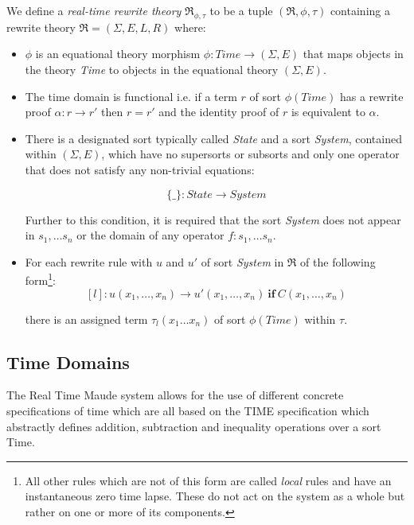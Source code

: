 \medskip
\begin{mydef}
We define a \emph{real-time rewrite theory} $\mathfrak{R}_{\phi,\tau}$ to be a tuple $(\mathfrak{R}, \phi,\tau)$ containing a rewrite theory $\mathfrak{R} = (\Sigma, E,L,R) $ where:

\begin{itemize}
\item $\phi$ is an equational theory morphism $\phi : \mathit{Time} \to (\Sigma, E)$ that maps objects in the theory \textit{Time} to objects in the equational theory $(\Sigma , E)$.

\item The time domain is functional i.e. if a term $r$ of sort $\phi(Time)$  has a rewrite proof $\alpha: r \to r'$ then $r = r'$ and the identity proof of $r$ is equivalent to $\alpha$.

\item There is a designated sort typically called \textit{State} and a sort \textit{System}, contained within $(\Sigma, E)$, which have no supersorts or subsorts and only one operator that does not satisfy any non-trivial equations:

$$\{\_\}: State \to System$$

Further to this condition, it is required that the sort \textit{System} does not appear in $s_1, \ldots s_n$  or the domain  of  any operator $f: s_1, \ldots s_n$.

\item For each rewrite rule with $u$ and $u'$ of sort \textit{System} in $\mathfrak{R}$ of the following form\footnote{All other rules which are not of this form are called \emph{local} rules and have an instantaneous zero time lapse. These do not act on the system as a whole but rather on one or more of its components.}:
$$[l]: u(x_1,\ldots ,x_n) \to u'(x_1,\ldots ,x_n) \ \textbf{if} \ C(x_1, \ldots ,x_n)$$


there is an assigned term $\tau_l(x_1 \ldots x_n)$ of sort $\phi(Time)$ within $\tau$.

\end{itemize}
\end{mydef}

\subsection*{Time Domains}
The Real Time Maude system allows for the use of different concrete specifications of time which are all based on the TIME specification which abstractly defines addition, subtraction and inequality operations over a sort Time. 

